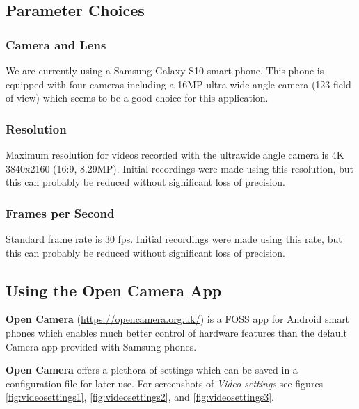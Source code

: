 \documentclass[12pt,letterpaper,english,bibliography=totocnumbered, abstract=on]{scrartcl}
\begin{document}
\subsection{Parameter Choices}

\subsubsection{Camera and Lens}

We are currently using a Samsung Galaxy S10 smart phone.  This phone is equipped with four cameras including a 16MP ultra-wide-angle camera (123\textdegree{} field of view) which seems to be a good  choice for this application.

\subsubsection{Resolution}

Maximum resolution for videos recorded with the ultrawide angle camera is 4K 3840x2160 (16:9, 8.29MP). Initial recordings were made using this resolution, but this can probably be reduced without significant loss of precision.

\subsubsection{Frames per Second}

Standard frame rate is 30 fps. Initial recordings were made using this rate, but this can probably be reduced without significant loss of precision.

\subsection{Using the Open Camera App}

\textbf{Open Camera} (\url{https://opencamera.org.uk/}) is a FOSS app for Android smart phones which enables much better control of hardware features than the default Camera app provided with Samsung phones. 

\textbf{Open Camera} offers a plethora of settings which can be saved in a configuration file for later use. 
For screenshots of \textit{Video settings} see figures \ref{fig:videosettings1}, \ref{fig:videosettings2}, and \ref{fig:videosettings3}. 
\end{document}
